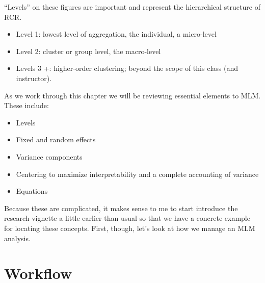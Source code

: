 \documentclass[
  english,
]{book}
\providecommand{\tightlist}{%
  \setlength{\itemsep}{0pt}\setlength{\parskip}{0pt}}
\begin{document}
``Levels'' on these figures are important and represent the hierarchical structure of RCR.

\begin{itemize}
\tightlist
\item
  Level 1: lowest level of aggregation, the individual, a micro-level
\item
  Level 2: cluster or group level, the macro-level
\item
  Levels 3 +: higher-order clustering; beyond the scope of this class (and instructor).
\end{itemize}

As we work through this chapter we will be reviewing essential elements to MLM. These include:

\begin{itemize}
\tightlist
\item
  Levels
\item
  Fixed and random effects
\item
  Variance components
\item
  Centering to maximize interpretability and a complete accounting of variance
\item
  Equations
\end{itemize}

Because these are complicated, it makes sense to me to start introduce the research vignette a little earlier than usual so that we have a concrete example for locating these concepts. First, though, let's look at how we manage an MLM analysis.

\hypertarget{workflow}{%
\section{Workflow}\label{workflow}}
\end{document}
